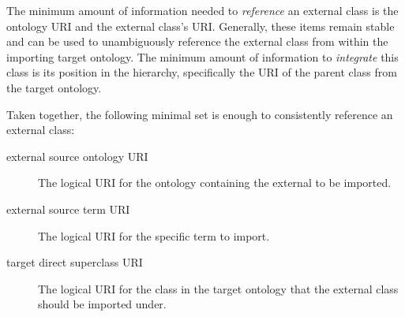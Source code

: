 \documentclass[a4paper,10pt,twocolumn]{article}
\begin{document}

The minimum amount of information needed to \textit{reference} an external class is the ontology URI and the external class's URI.
Generally, these items remain stable and can be used to unambiguously reference the external class from within the importing target ontology.
The minimum amount of information to \textit{integrate} this class is its position in the hierarchy, specifically the URI of the parent class from the target ontology.


Taken together, the following minimal set is enough to consistently reference an external class:
\begin{description}
 \item[external source ontology URI] The logical URI for the ontology containing the external to be imported. %
 \item[external source term URI] The logical URI for the specific term to import. %
 \item[target direct superclass URI] The logical URI for the class in the target ontology that the external class should be imported under. %
 \end{description} 
 
\end{document}
